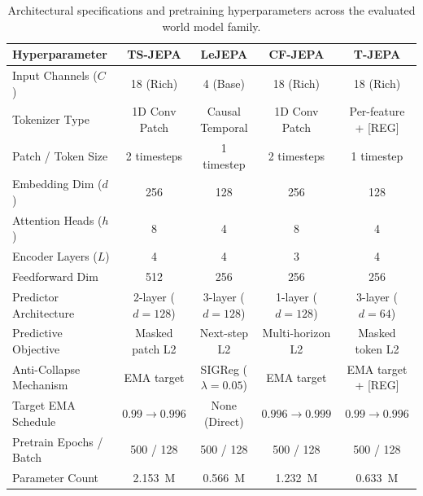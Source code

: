 \begin{table}[t]
    \caption{Architectural specifications and pretraining hyperparameters across the evaluated world model family.}
    \label{tab:arch_specs}
    \centering
    \small
    \setlength{\tabcolsep}{8pt}
    \begin{tabular}{lcccc}
        \toprule
        Hyperparameter & TS-JEPA & LeJEPA & CF-JEPA & T-JEPA \\
        \midrule
        Input Channels ($C$)       & 18 (Rich)         & 4 (Base)          & 18 (Rich)         & 18 (Rich) \\
        Tokenizer Type             & 1D Conv Patch     & Causal Temporal   & 1D Conv Patch     & Per-feature + [REG] \\
        Patch / Token Size         & 2 timesteps       & 1 timestep        & 2 timesteps       & 1 timestep \\
        Embedding Dim ($d$)        & 256               & 128               & 256               & 128 \\
        Attention Heads ($h$)      & 8                 & 4                 & 8                 & 4 \\
        Encoder Layers ($L$)       & 4                 & 4                 & 3                 & 4 \\
        Feedforward Dim            & 512               & 256               & 256               & 256 \\
        Predictor Architecture     & 2-layer ($d=128$) & 3-layer ($d=128$) & 1-layer ($d=128$) & 3-layer ($d=64$) \\
        Predictive Objective       & Masked patch L2   & Next-step L2      & Multi-horizon L2  & Masked token L2 \\
        Anti-Collapse Mechanism    & EMA target        & SIGReg ($\lambda=0.05$) & EMA target  & EMA target + [REG] \\
        Target EMA Schedule        & $0.99 \to 0.996$  & None (Direct)     & $0.996 \to 0.999$ & $0.99 \to 0.996$ \\
        Pretrain Epochs / Batch    & 500 / 128         & 500 / 128         & 500 / 128         & 500 / 128 \\
        Parameter Count            & 2.153~M           & 0.566~M           & 1.232~M           & 0.633~M \\
        \bottomrule
    \end{tabular}
\end{table}

